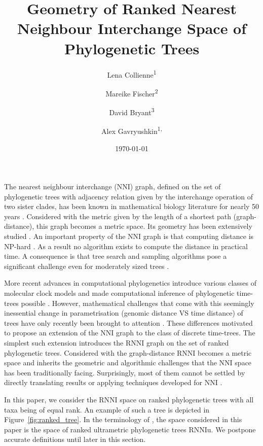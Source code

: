 \documentclass{amsart}
\title[Ranked Nearest Neighbour Intarchange]{Geometry of Ranked Nearest Neighbour Interchange Space of Phylogenetic Trees}
\date{\today}
\author{Lena Collienne\textsuperscript{1}}
\author{Mareike Fischer\textsuperscript{2}}
\author{David Bryant\textsuperscript{3}}
\author{Alex Gavryushkin\textsuperscript{1, \Letter}}
\newcommand{\nni}{\mathrm{NNI}}
\newcommand{\rnni}{\mathrm{RNNI}}
\newcommand{\rnniu}{\mathrm{RNNIu}}
\begin{document}
\begin{abstract}

\end{abstract}

\maketitle

The nearest neighbour interchange ($\nni$) graph, defined on the set of phylogenetic trees with adjacency relation given by the interchange operation of two sister clades, has been known in mathematical biology literature for nearly 50 years \autocite{Robinson1971-ql,Moore1973-kk}.
Considered with the metric given by the length of a shortest path (graph-distance), this graph becomes a metric space.
Its geometry has been extensively studied \autocite{Dasgupta2000-xa, Li1996-zw, Gordon2013-fw, De_Jong2016-al}.
An important property of the $\nni$ graph is that computing distance is NP-hard \autocite{Dasgupta2000-xa}.
As a result no algorithm exists to compute the distance in practical time.
A consequence is that tree search and sampling algorithms pose a significant challenge even for moderately sized trees
\autocite{Whidden2018-tk}.

More recent advances in computational phylogenetics introduce various classes of molecular clock models \autocite{Yoder2000-ks,Drummond2006-nl,Drummond2010-yf} and made computational inference of phylogenetic time-trees possible \autocite{Ronquist2003-eq, Bouckaert2018-yr, Hadfield2018-xp}.
However, mathematical challenges that come with this seemingly inessential change in parametrisation (genomic distance VS time distance) of trees have only recently been brought to attention \autocite{Gavryushkin2016-uu}.
These differences motivated \textcite{Gavryushkin2018-ol} to propose an extension of the $\nni$ graph to the class of discrete time-trees.
The simplest such extension introduces the $\rnni$ graph on the set of ranked phylogenetic trees.
Considered with the graph-distance $\rnni$ becomes a metric space and inherits the geometric and algorithmic challenges that the $\nni$ space has been traditionally facing.
Surprisingly, most of them cannot be settled by directly translating results or applying techniques developed for $\nni$ \autocite{Gavryushkin2018-ol}.

In this paper, we consider the $\rnni$ space on ranked phylogenetic trees with all taxa being of equal rank.
An example of such a tree is depicted in Figure~\ref{fig:ranked_tree}.
In the terminology of \autocite{Gavryushkin2018-ol}, the space considered in this paper is the space of ranked ultrametric phylogenetic trees $\rnniu$.
We postpone accurate definitions until later in this section.
\end{document}
